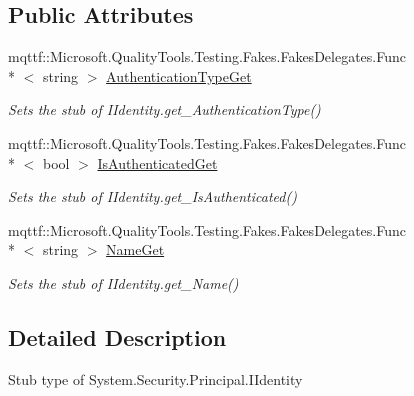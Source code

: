 \subsection*{Public Attributes}
\begin{DoxyCompactItemize}
\item 
mqttf\-::\-Microsoft.\-Quality\-Tools.\-Testing.\-Fakes.\-Fakes\-Delegates.\-Func\\*
$<$ string $>$ \hyperlink{class_system_1_1_security_1_1_principal_1_1_fakes_1_1_stub_i_identity_aececd80853cdc12b0098e93e4f01fbbe}{Authentication\-Type\-Get}
\begin{DoxyCompactList}\small\item\em Sets the stub of I\-Identity.\-get\-\_\-\-Authentication\-Type()\end{DoxyCompactList}\item 
mqttf\-::\-Microsoft.\-Quality\-Tools.\-Testing.\-Fakes.\-Fakes\-Delegates.\-Func\\*
$<$ bool $>$ \hyperlink{class_system_1_1_security_1_1_principal_1_1_fakes_1_1_stub_i_identity_a0fde783af24ddc9d63b3806e6f348f82}{Is\-Authenticated\-Get}
\begin{DoxyCompactList}\small\item\em Sets the stub of I\-Identity.\-get\-\_\-\-Is\-Authenticated()\end{DoxyCompactList}\item 
mqttf\-::\-Microsoft.\-Quality\-Tools.\-Testing.\-Fakes.\-Fakes\-Delegates.\-Func\\*
$<$ string $>$ \hyperlink{class_system_1_1_security_1_1_principal_1_1_fakes_1_1_stub_i_identity_aec36e15192ff1d8283441cdf5b2320b7}{Name\-Get}
\begin{DoxyCompactList}\small\item\em Sets the stub of I\-Identity.\-get\-\_\-\-Name()\end{DoxyCompactList}\end{DoxyCompactItemize}


\subsection{Detailed Description}
Stub type of System.\-Security.\-Principal.\-I\-Identity



